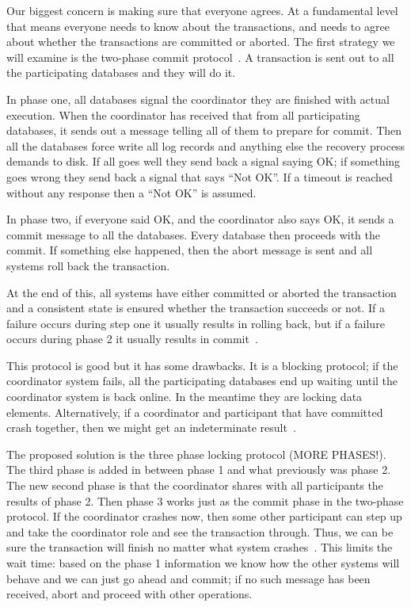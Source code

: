 \documentclass[a4paper]{report}
\begin{document}
Our biggest concern is making sure that everyone agrees. At a fundamental level that means everyone needs to know about the transactions, and needs to agree about whether the transactions are committed or aborted. The first strategy we will examine is the two-phase commit protocol~\cite{fds}. A transaction is sent out to all the participating databases and they will do it.

In phase one, all databases signal the coordinator they are finished with actual execution. When the coordinator has received that from all participating databases, it sends out a message telling all of them to prepare for commit. Then all the databases force write all log records and anything else the recovery process demands to disk. If all goes well they send back a signal saying OK; if something goes wrong they send back a signal that says ``Not OK''. If a timeout is reached without any response then a ``Not OK'' is assumed.

In phase two, if everyone said OK, and the coordinator also says OK, it sends a commit message to all the databases. Every database then proceeds with the commit. If something else happened, then the abort message is sent and all systems roll back the transaction. 

At the end of this, all systems have either committed or aborted the transaction and a consistent state is ensured whether the transaction succeeds or not. If a failure occurs during step one it usually results in rolling back, but if a failure occurs during phase 2 it usually results in commit~\cite{fds}.

This protocol is good but it has some drawbacks. It is a blocking protocol; if the coordinator system fails, all the participating databases end up waiting until the coordinator system is back online. In the meantime they are locking data elements. Alternatively, if a coordinator and participant that have committed crash together, then we might get an indeterminate result~\cite{fds}.

The proposed solution is the three phase locking protocol (MORE PHASES!). The third phase is added in between phase 1 and what previously was phase 2. The new second phase is that the coordinator shares with all participants the results of phase 2. Then phase 3 works just as the commit phase in the two-phase protocol. If the coordinator crashes now, then some other participant can step up and take the coordinator role and see the transaction through. Thus, we can be sure the transaction will finish no matter what system crashes~\cite{fds}. This limits the wait time: based on the phase 1 information we know how the other systems will behave and we can just go ahead and commit; if no such message has been received, abort and proceed with other operations.
\end{document}
